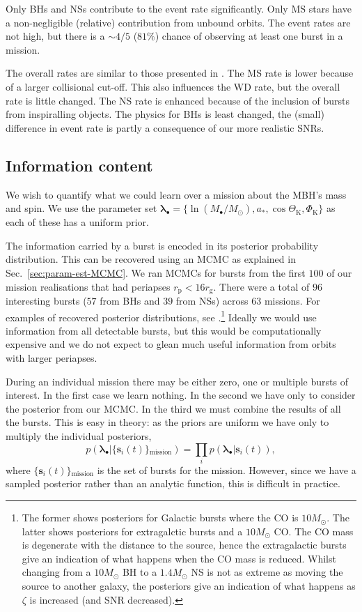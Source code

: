 \documentclass[useAMS,usedcolumn,usegraphicx,usenatbib]{mn2e}
\newcommand{\secref}[1]{Sec.~\ref{sec:#1}}
\newcommand{\sub}[1]{\ensuremath{_\mathrm{#1}}}
\begin{document}
Only BHs and NSs contribute to the event rate significantly. Only MS stars have a non-negligible (relative) contribution from unbound orbits. The event rates are not high, but there is a $\sim 4/5$ ($81\%$) chance of observing at least one burst in a mission.

The overall rates are similar to those presented in \citet{Hopman2007}. The MS rate is lower because of a larger collisional cut-off. This also influences the WD rate, but the overall rate is little changed. The NS rate is enhanced because of the inclusion of bursts from inspiralling objects. The physics for BHs is least changed, the (small) difference in event rate is partly a consequence of our more realistic SNRs.

\subsection{Information content}

We wish to quantify what we could learn over a mission about the MBH's mass and spin. We use the parameter set $\boldsymbol{\lambda}_\bullet = \{\ln (M_\bullet/M_\odot), a_\ast, \cos \Theta\sub{K}, \Phi\sub{K}\}$ as each of these has a uniform prior.

The information carried by a burst is encoded in its posterior probability distribution. This can be recovered using an MCMC as explained in \secref{param-est-MCMC}. We ran MCMCs for bursts from the first $100$ of our mission realisations that had periapses $r\sub{p} < 16 r\sub{g}$. There were a total of $96$ interesting bursts ($57$ from BHs and $39$ from NSs) across $63$ missions. For examples of recovered posterior distributions, see \citet{Berry2013,Berry2013a}.\footnote{The former shows posteriors for Galactic bursts where the CO is $10 M_\odot$. The latter shows posteriors for extragalctic bursts and a $10 M_\odot$ CO. The CO mass is degenerate with the distance to the source, hence the extragalactic bursts give an indication of what happens when the CO mass is reduced. Whilst changing from a $10 M_\odot$ BH to a $1.4 M_\odot$ NS is not as extreme as moving the source to another galaxy, the posteriors give an indication of what happens as $\zeta$ is increased (and SNR decreased).} Ideally we would use information from all detectable bursts, but this would be computationally expensive and we do not expect to glean much useful information from orbits with larger periapses.

During an individual mission there may be either zero, one or multiple bursts of interest. In the first case we learn nothing. In the second we have only to consider the posterior from our MCMC. In the third we must combine the results of all the bursts. This is easy in theory: as the priors are uniform we have only to multiply the individual posteriors,
\begin{equation}
p(\boldsymbol{\lambda}_\bullet|\{\boldsymbol{s}_i(t)\}\sub{mission}) = \prod_i p(\boldsymbol{\lambda}_\bullet|\boldsymbol{s}_i(t)),
\end{equation}
where $\{\boldsymbol{s}_i(t)\}\sub{mission}$ is the set of bursts for the mission. However, since we have a sampled posterior rather than an analytic function, this is difficult in practice.
\end{document}
